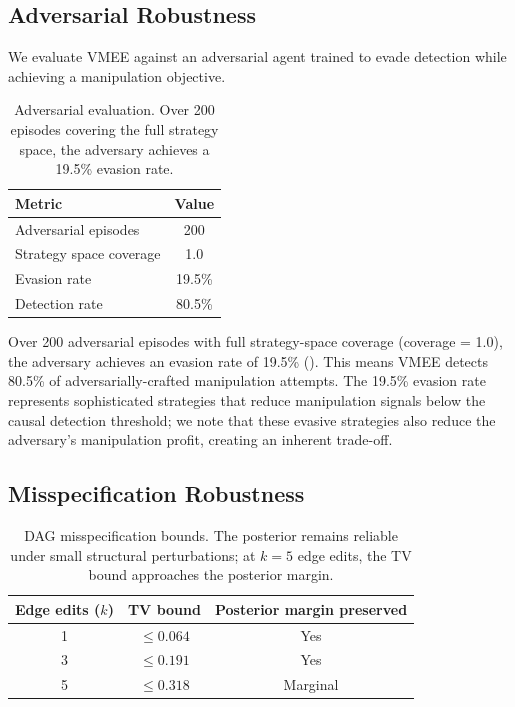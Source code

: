 \documentclass[11pt]{article}
\begin{document}
\subsection{Adversarial Robustness}

We evaluate VMEE against an adversarial agent trained to evade detection while achieving a manipulation objective.

\begin{table}[t]
\centering
\begin{tabular}{@{}lc@{}}
\toprule
\textbf{Metric} & \textbf{Value} \\
\midrule
Adversarial episodes    & 200 \\
Strategy space coverage & 1.0 \\
Evasion rate            & 19.5\% \\
Detection rate          & 80.5\% \\
\bottomrule
\end{tabular}
\caption{Adversarial evaluation. Over 200 episodes covering the full strategy space, the adversary achieves a 19.5\% evasion rate.}
\label{tab:adversarial}
\end{table}

Over 200 adversarial episodes with full strategy-space coverage (coverage = 1.0), the adversary achieves an evasion rate of 19.5\% ().
This means VMEE detects 80.5\% of adversarially-crafted manipulation attempts.
The 19.5\% evasion rate represents sophisticated strategies that reduce manipulation signals below the causal detection threshold; we note that these evasive strategies also reduce the adversary's manipulation profit, creating an inherent trade-off.

\subsection{Misspecification Robustness}

\begin{table}[t]
\centering
\begin{tabular}{@{}ccc@{}}
\toprule
\textbf{Edge edits ($k$)} & \textbf{TV bound} & \textbf{Posterior margin preserved} \\
\midrule
1 & $\leq 0.064$ & Yes \\
3 & $\leq 0.191$ & Yes \\
5 & $\leq 0.318$ & Marginal \\
\bottomrule
\end{tabular}
\caption{DAG misspecification bounds. The posterior remains reliable under small structural perturbations; at $k=5$ edge edits, the TV bound approaches the posterior margin.}
\label{tab:misspec}
\end{table}
\end{document}
